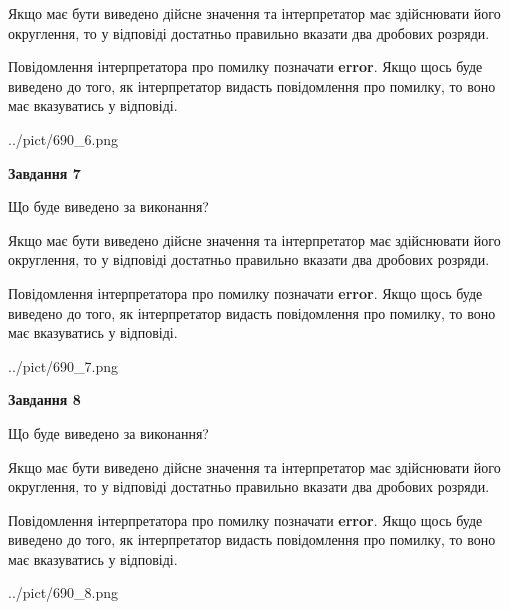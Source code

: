 \documentclass[12pt, ukrainian]{article}
\begin{document}
{\begin {Large}
Якщо має бути виведено дійсне значення та інтерпретатор має здійснювати його округлення, 
то у відповіді достатньо правильно вказати два дробових розряди.

Повідомлення інтерпретатора про помилку позначати \textbf{error}.
Якщо щось буде виведено до того, як інтерпретатор видасть повідомлення про помилку, 
то воно має вказуватись у відповіді. \par

\begin{center}
	{../pict/690_6.png}
\end{center}
\newpage

{\begin {center}\textbf{Завдання 7}\end {center}}\par
Що буде виведено за виконання? \par

Якщо має бути виведено дійсне значення та інтерпретатор має здійснювати його округлення, 
то у відповіді достатньо правильно вказати два дробових розряди.

Повідомлення інтерпретатора про помилку позначати \textbf{error}.
Якщо щось буде виведено до того, як інтерпретатор видасть повідомлення про помилку, 
то воно має вказуватись у відповіді. \par

\begin{center}
	{../pict/690_7.png}
\end{center}
\newpage

{\begin {center}\textbf{Завдання 8}\end {center}}\par
Що буде виведено за виконання? \par

Якщо має бути виведено дійсне значення та інтерпретатор має здійснювати його округлення, 
то у відповіді достатньо правильно вказати два дробових розряди.

Повідомлення інтерпретатора про помилку позначати \textbf{error}.
Якщо щось буде виведено до того, як інтерпретатор видасть повідомлення про помилку, 
то воно має вказуватись у відповіді. \par

\begin{center}
	{../pict/690_8.png}
\end{center}
\newpage


\end{Large}}
\end{document}
